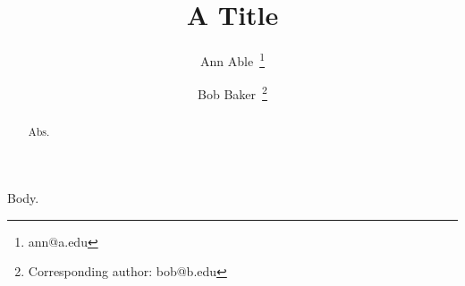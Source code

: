 \documentclass[onecolumn,aps,prd,superscriptaddress,nofootinbib,notitlepage]{revtex4-1}
\begin{document}
\title{A Title}
\author{Ann Able~\footnote{ann@a.edu}}
\author{Bob Baker~\footnote{Corresponding author: bob@b.edu}}
\begin{abstract}Abs.\end{abstract}
\maketitle
Body.
\end{document}
